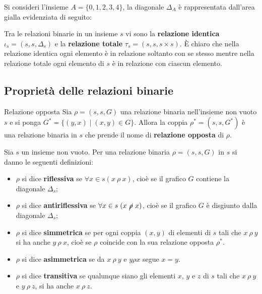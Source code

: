 \begin{example}
	Si consideri l'insieme $A=\{0,1,2,3,4\}$, la diagonale $\Delta_{A}$ è rappresentata dall'area gialla evidenziata di seguito:
	\begin{center}
	\end{center}
\end{example}

\begin{example}
	Tra le relazioni binarie in un insieme $s$ vi sono la \textbf{relazione identica} $\iota_{s} = (s,s, \Delta_{s})$ e la \textbf{relazione totale} $\tau_{s}=(s,s,s \times s)$. È chiaro che nella relazione identica ogni elemento è in relazione soltanto con se stesso mentre nella relazione totale ogni elemento di $s$ è in relazione con ciascun elemento.
\end{example}

\subsection{Proprietà delle relazioni binarie}
\begin{defbox}{Relazione opposta}
	Sia $\rho = (s,s,G)$ una relazione binaria nell'insieme non vuoto $s$ e si ponga $G^{*}=\{(y,x)\;|\; (x,y) \in G\}$. Allora la coppia $\rho^{*}=(s,s,G^{*})$ è una relazione binaria in $s$ che prende il nome di \textbf{relazione opposta} di $\rho$.
\end{defbox}

Sia $s$ un insieme non vuoto. Per una relazione binaria $\rho = (s,s,G)$ in $s$ si danno le seguenti definizioni:
\begin{itemize}
	\item $\rho$ si dice \textbf{riflessiva} se	$\forall x \in s (x \ \rho \ x)$, cioè se il grafico $G$ contiene la diagonale $\Delta_{s}$;
	\item $\rho$ si dice \textbf{antiriflessiva} se $\forall x \in s \; (x \ \cancel{\rho} \ x)$, cioè se il grafico $G$ è disgiunto dalla diagonale $\Delta_{s}$;
	\item $\rho$ si dice \textbf{simmetrica} se per ogni coppia $(x,y)$ di elementi di $s$ tali che $x \ \rho \ y$ si ha anche $y \ \rho \ x$, cioè se $\rho$ coincide con la sua relazione opposta $\rho^{*}$.
	\item $\rho$ si dice \textbf{asimmetrica} se da $x \  \rho  \ y$ e $y \rho x$ segue $x=y$.
	\item $\rho$ si dice \textbf{transitiva} se qualunque siano gli elementi $x$, $y$ e $z$ di $s$ tali che $x \ \rho \ y$ e $y \ \rho \ z$, si ha anche $x \ \rho \ z$.
\end{itemize}

